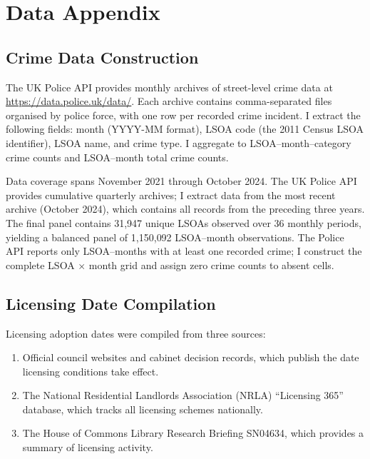 \documentclass[12pt]{article}
\begin{document}
\newpage
\appendix


\section{Data Appendix}

\subsection{Crime Data Construction}

The UK Police API provides monthly archives of street-level crime data at \url{https://data.police.uk/data/}. Each archive contains comma-separated files organised by police force, with one row per recorded crime incident. I extract the following fields: month (YYYY-MM format), LSOA code (the 2011 Census LSOA identifier), LSOA name, and crime type. I aggregate to LSOA--month--category crime counts and LSOA--month total crime counts.

Data coverage spans November 2021 through October 2024. The UK Police API provides cumulative quarterly archives; I extract data from the most recent archive (October 2024), which contains all records from the preceding three years. The final panel contains 31{,}947 unique LSOAs observed over 36 monthly periods, yielding a balanced panel of 1{,}150{,}092 LSOA--month observations. The Police API reports only LSOA--months with at least one recorded crime; I construct the complete LSOA $\times$ month grid and assign zero crime counts to absent cells.

\subsection{Licensing Date Compilation}

Licensing adoption dates were compiled from three sources:
\begin{enumerate}
\item Official council websites and cabinet decision records, which publish the date licensing conditions take effect.
\item The National Residential Landlords Association (NRLA) ``Licensing 365'' database, which tracks all licensing schemes nationally.
\item The House of Commons Library Research Briefing SN04634, which provides a summary of licensing activity.
\end{enumerate}
\end{document}
